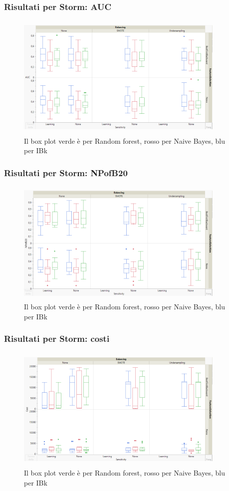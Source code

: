 \documentclass{beamer}
\begin{document}
\begin{frame}
	\frametitle{Risultati per Storm: AUC}
	
	\centering
	\begin{figure}
	\includegraphics[width=10cm, height=6cm]{storm-auc}
	\caption{Il box plot verde è per Random forest, rosso per Naive Bayes, blu per IBk}
	\end{figure}
\end{frame}

\begin{frame}
	\frametitle{Risultati per Storm: NPofB20}
	
	\centering
	\begin{figure}
	\includegraphics[width=10cm, height=6cm]{storm-npofb20}
	\caption{Il box plot verde è per Random forest, rosso per Naive Bayes, blu per IBk}
	\end{figure}
\end{frame}

\begin{frame}
	\frametitle{Risultati per Storm: costi}
	
	\centering
	\begin{figure}
	\includegraphics[width=10cm, height=6cm]{storm-cost}
	\caption{Il box plot verde è per Random forest, rosso per Naive Bayes, blu per IBk}
	\end{figure}
\end{frame}
\end{document}
